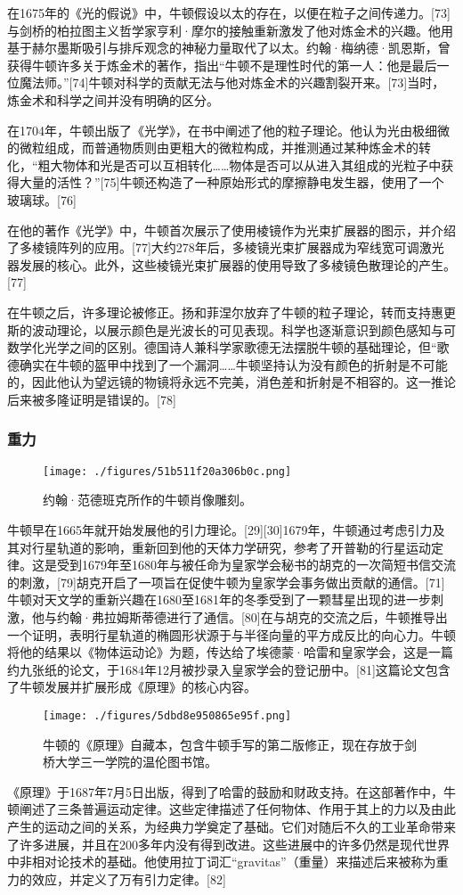 在1675年的《光的假说》中，牛顿假设以太的存在，以便在粒子之间传递力。[73]与剑桥的柏拉图主义哲学家亨利·摩尔的接触重新激发了他对炼金术的兴趣。他用基于赫尔墨斯吸引与排斥观念的神秘力量取代了以太。约翰·梅纳德·凯恩斯，曾获得牛顿许多关于炼金术的著作，指出“牛顿不是理性时代的第一人：他是最后一位魔法师。”[74]牛顿对科学的贡献无法与他对炼金术的兴趣割裂开来。[73]当时，炼金术和科学之间并没有明确的区分。

在1704年，牛顿出版了《光学》，在书中阐述了他的粒子理论。他认为光由极细微的微粒组成，而普通物质则由更粗大的微粒构成，并推测通过某种炼金术的转化，“粗大物体和光是否可以互相转化……物体是否可以从进入其组成的光粒子中获得大量的活性？”[75]牛顿还构造了一种原始形式的摩擦静电发生器，使用了一个玻璃球。[76]

在他的著作《光学》中，牛顿首次展示了使用棱镜作为光束扩展器的图示，并介绍了多棱镜阵列的应用。[77]大约278年后，多棱镜光束扩展器成为窄线宽可调激光器发展的核心。此外，这些棱镜光束扩展器的使用导致了多棱镜色散理论的产生。[77]

在牛顿之后，许多理论被修正。扬和菲涅尔放弃了牛顿的粒子理论，转而支持惠更斯的波动理论，以展示颜色是光波长的可见表现。科学也逐渐意识到颜色感知与可数学化光学之间的区别。德国诗人兼科学家歌德无法摆脱牛顿的基础理论，但“歌德确实在牛顿的盔甲中找到了一个漏洞……牛顿坚持认为没有颜色的折射是不可能的，因此他认为望远镜的物镜将永远不完美，消色差和折射是不相容的。这一推论后来被多隆证明是错误的。[78]
\subsubsection{重力}
\begin{figure}[ht]
\centering
\texttt{[image: ./figures/51b511f20a306b0c.png]}
\caption{约翰·范德班克所作的牛顿肖像雕刻。} \label{fig_Newton_6}
\end{figure}
牛顿早在1665年就开始发展他的引力理论。[29][30]1679年，牛顿通过考虑引力及其对行星轨道的影响，重新回到他的天体力学研究，参考了开普勒的行星运动定律。这是受到1679年至1680年与被任命为皇家学会秘书的胡克的一次简短书信交流的刺激，[79]胡克开启了一项旨在促使牛顿为皇家学会事务做出贡献的通信。[71]牛顿对天文学的重新兴趣在1680至1681年的冬季受到了一颗彗星出现的进一步刺激，他与约翰·弗拉姆斯蒂德进行了通信。[80]在与胡克的交流之后，牛顿推导出一个证明，表明行星轨道的椭圆形状源于与半径向量的平方成反比的向心力。牛顿将他的结果以《物体运动论》为题，传达给了埃德蒙·哈雷和皇家学会，这是一篇约九张纸的论文，于1684年12月被抄录入皇家学会的登记册中。[81]这篇论文包含了牛顿发展并扩展形成《原理》的核心内容。
\begin{figure}[ht]
\centering
\texttt{[image: ./figures/5dbd8e950865e95f.png]}
\caption{牛顿的《原理》自藏本，包含牛顿手写的第二版修正，现在存放于剑桥大学三一学院的温伦图书馆。} \label{fig_Newton_7}
\end{figure}
《原理》于1687年7月5日出版，得到了哈雷的鼓励和财政支持。在这部著作中，牛顿阐述了三条普遍运动定律。这些定律描述了任何物体、作用于其上的力以及由此产生的运动之间的关系，为经典力学奠定了基础。它们对随后不久的工业革命带来了许多进展，并且在200多年内没有得到改进。这些进展中的许多仍然是现代世界中非相对论技术的基础。他使用拉丁词汇“gravitas”（重量）来描述后来被称为重力的效应，并定义了万有引力定律。[82]

